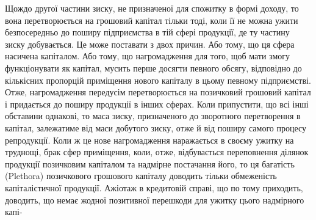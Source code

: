 Щождо другої частини зиску, не призначеної для спожитку в формі доходу,
то вона перетворюється на грошовий капітал тільки тоді, коли її не можна
ужити безпосередньо до поширу підприємства в тій сфері продукції, де ту частину
зиску добувається. Це може поставати з двох причин. Або тому, що ця сфера
насичена капіталом. Або тому, що нагромадження для того, щоб мати змогу
функціонувати як капітал, мусить перше досягти певного обсягу, відповідно
до кількісних пропорцій приміщення нового капіталу в цьому певному підприємстві.
Отже, нагромадження передусім перетворюється на позичковий грошовий капітал
і придається до поширу продукції в інших сферах. Коли припустити, що всі
інші обставини однакові, то маса зиску, призначеного до зворотного перетворення
в капітал, залежатиме від маси добутого зиску, отже й від поширу самого процесу
репродукції. Коли ж це нове нагромадження наражається в своєму ужитку
на труднощі, брак сфер приміщення, коли, отже, відбувається переповнення ділянок
продукції позичковим капіталом та надмірне постачання його, то ця багатість
(Plethora) позичкового грошового капіталу доводить тільки обмеженість капіталістичної
продукції. Ажіотаж в кредитовій справі, що по тому приходить, доводить,
що немає жодної позитивної перешкоди для ужитку цього надмірного капі-
